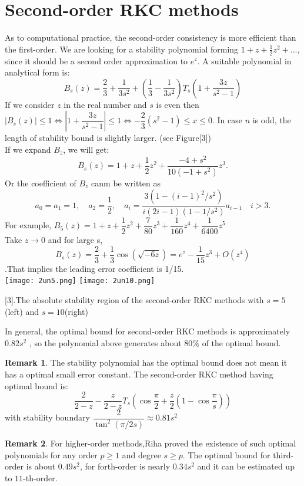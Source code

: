 \documentclass{article}
\theoremstyle{theorem}
\theoremstyle{definition}
\newtheorem*{remark}{Remark}
\begin{document}
	\section{Second-order RKC methods}
	As to computational practice, the second-order consistency is more efficient than the first-order. We are looking for a stability polynomial forming $1+z+\frac{1}{2}z^2+...$, since it should be a second order approximation to $e^z$. A suitable polynomial in analytical form is:
	$$B_s(z)=\frac{2}{3}+\frac{1}{3s^2}+\left(\frac{1}{3}-\frac{1}{3s^2}\right)T_s\left(1+\frac{3z}{s^2-1}\right)$$
	If we consider $z$ in the real number and $s$ is even then $|B_s(z)| \le 1 \Leftrightarrow |1+\dfrac{3z}{s^2-1}| \le 1 \Leftrightarrow -\dfrac{2}{3}(s^2-1) \le x \le 0$. In case $n$ is odd, the length of stability bound is slightly larger. (see Figure[3])\\
	If we expand $B_z$, we will get:
	$$B_s(z)=1+z+\frac{1}{2}z^2+\frac{-4+s^2}{10(-1+s^2)}z^3.$$ Or the coefficient of $B_z$ canm be written as $$a_0=a_1=1,\quad a_2=\frac{1}{2}, \quad a_i=\frac{3(1-(i-1)^2/s^2)}{i(2i-1)(1-1/s^2)}a_{i-1} \quad i>3.$$  
	For example, $B_5(z)=1+z+\dfrac{1}{2}z^2+\dfrac{7}{80}z^3+\dfrac{1}{160}z^4+\dfrac{1}{6400}z^5$\\
	Take $z \to 0$ and for large s,  
	$$B_s(z)=\frac{2}{3}+\frac{1}{3} \cos(\sqrt{-6z})=e^z-\frac{1}{15}z^3+O(z^4)$$.That implies the leading error coefficient is 1/15. \\
		\texttt{[image: 2un5.png]}	
	\texttt{[image: 2un10.png]}
	\begin{center}
		\figurename[3]{.The absolute stability region of the second-order RKC methods with $s=5$(left) and $s=10$(right)}
	\end{center} 
	In general, the optimal bound for second-order RKC methods is approximately $0.82s^2$ , so the polynomial above generates about $80\%$ of the optimal bound.
	\begin{remark}
		The stability polynomial has the optimal bound does not mean it has a optimal small error constant. The second-order RKC method having optimal bound is:
		$$\frac{2}{2-z} - \frac{z}{2-z}T_s(\cos \frac{\pi}{2}+\frac{z}{2}(1-\cos \frac{\pi}{s}))$$ with stability boundary $\dfrac{2}{\tan^2(\pi/2s)} \approx 0.81s^2$ 
	\end{remark}
	\begin{remark}
		For higher-order methods,Riha proved the existence of such optimal polynomials for any order $p \ge 1$ and degree $s \ge p$. The optimal bound for  third-order is about $0.49 s^2$, for forth-order is nearly $0.34s^2$ and it can be estimated up to $11$-th-order. 
	\end{remark}
\end{document}
